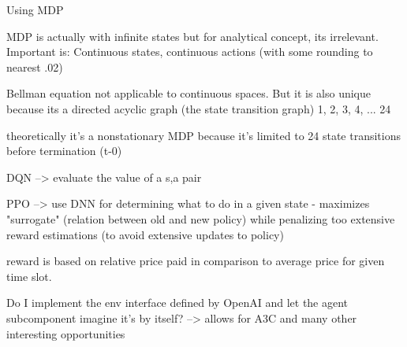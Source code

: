 Using \ac {MDP}

\ac {MDP} is actually with infinite states but for analytical concept, its irrelevant. Important is: Continuous states,
continuous actions (with some rounding to nearest .02)

Bellman equation not applicable to continuous spaces. But it is also unique because its a directed acyclic graph (the
state transition graph) 1, 2, 3, 4, ... 24

theoretically it's a nonstationary \ac {MDP} because it's limited to 24 state transitions before termination (t-0)

DQN --> evaluate the value of a s,a pair

\ac {PPO} --> use DNN for determining what to do in a given state - maximizes "surrogate" (relation between old and new
policy) while penalizing too extensive reward estimations (to avoid extensive updates to policy)

reward is based on relative price paid in comparison to average price for given time slot.

Do I implement the env interface defined by OpenAI and let the agent subcomponent imagine it's by itself? --> allows for
A3C and many other interesting opportunities

